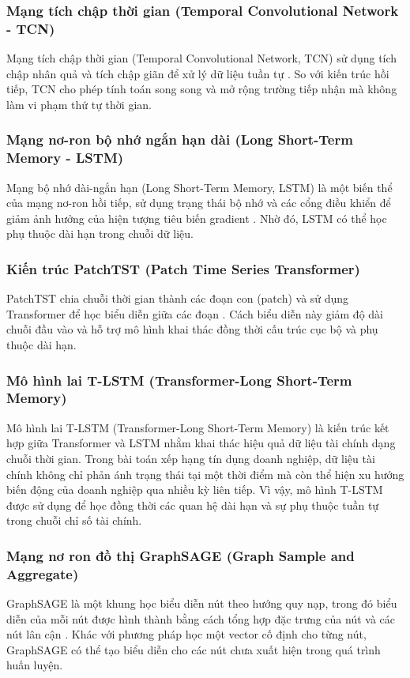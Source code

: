 \documentclass[10pt,twoside]{article}
\begin{document}
\subsubsection{Mạng tích chập thời gian (Temporal Convolutional Network - TCN)}
Mạng tích chập thời gian (Temporal Convolutional Network, TCN) sử dụng tích chập nhân quả và tích chập giãn để xử lý dữ liệu tuần tự \cite{bai_empirical_2018}. So với kiến trúc hồi tiếp, TCN cho phép tính toán song song và mở rộng trường tiếp nhận mà không làm vi phạm thứ tự thời gian.
\subsubsection{Mạng nơ-ron bộ nhớ ngắn hạn dài (Long Short-Term Memory - LSTM)}
Mạng bộ nhớ dài-ngắn hạn (Long Short-Term Memory, LSTM) là một biến thể của mạng nơ-ron hồi tiếp, sử dụng trạng thái bộ nhớ và các cổng điều khiển để giảm ảnh hưởng của hiện tượng tiêu biến gradient \cite{hochreiter_long_1997}. Nhờ đó, LSTM có thể học phụ thuộc dài hạn trong chuỗi dữ liệu.
\subsubsection{Kiến trúc PatchTST (Patch Time Series Transformer)}
PatchTST chia chuỗi thời gian thành các đoạn con (patch) và sử dụng Transformer để học biểu diễn giữa các đoạn \cite{nie_time_2023}. Cách biểu diễn này giảm độ dài chuỗi đầu vào và hỗ trợ mô hình khai thác đồng thời cấu trúc cục bộ và phụ thuộc dài hạn.
\subsubsection{Mô hình lai T-LSTM (Transformer-Long Short-Term Memory)}
Mô hình lai T-LSTM (Transformer-Long Short-Term Memory) \cite{kofune_enhancing_2026} là kiến trúc kết hợp giữa Transformer và LSTM nhằm khai thác hiệu quả dữ liệu tài chính dạng chuỗi thời gian. Trong bài toán xếp hạng tín dụng doanh nghiệp, dữ liệu tài chính không chỉ phản ánh trạng thái tại một thời điểm mà còn thể hiện xu hướng biến động của doanh nghiệp qua nhiều kỳ liên tiếp. Vì vậy, mô hình T-LSTM được sử dụng để học đồng thời các quan hệ dài hạn và sự phụ thuộc tuần tự trong chuỗi chỉ số tài chính.
\subsubsection{Mạng nơ ron đồ thị GraphSAGE (Graph Sample and Aggregate)}
GraphSAGE là một khung học biểu diễn nút theo hướng quy nạp, trong đó biểu diễn của mỗi nút được hình thành bằng cách tổng hợp đặc trưng của nút và các nút lân cận \cite{hamilton_inductive_2018}. Khác với phương pháp học một vector cố định cho từng nút, GraphSAGE có thể tạo biểu diễn cho các nút chưa xuất hiện trong quá trình huấn luyện.
\end{document}
